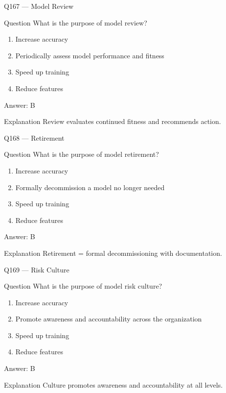 \documentclass[aspectratio=169,8pt]{beamer}
\begin{document}
	\begin{frame}{Q167 --- Model Review}
		\begin{block}{Question}
			What is the purpose of model review?
		\end{block}
		\begin{enumerate}
			\item Increase accuracy
			\item Periodically assess model performance and fitness
			\item Speed up training
			\item Reduce features
		\end{enumerate}
		\begin{exampleblock}{Answer: B}\end{exampleblock}
		\begin{block}{Explanation}
			Review evaluates continued fitness and recommends action.
		\end{block}
	\end{frame}
	
	\begin{frame}{Q168 --- Retirement}
		\begin{block}{Question}
			What is the purpose of model retirement?
		\end{block}
		\begin{enumerate}
			\item Increase accuracy
			\item Formally decommission a model no longer needed
			\item Speed up training
			\item Reduce features
		\end{enumerate}
		\begin{exampleblock}{Answer: B}\end{exampleblock}
		\begin{block}{Explanation}
			Retirement = formal decommissioning with documentation.
		\end{block}
	\end{frame}
	
	\begin{frame}{Q169 --- Risk Culture}
		\begin{block}{Question}
			What is the purpose of model risk culture?
		\end{block}
		\begin{enumerate}
			\item Increase accuracy
			\item Promote awareness and accountability across the organization
			\item Speed up training
			\item Reduce features
		\end{enumerate}
		\begin{exampleblock}{Answer: B}\end{exampleblock}
		\begin{block}{Explanation}
			Culture promotes awareness and accountability at all levels.
		\end{block}
	\end{frame}
	
\end{document}
